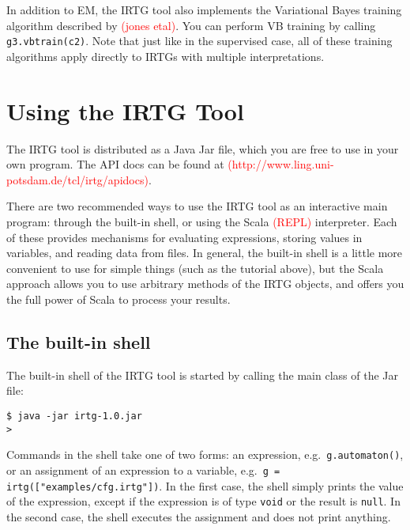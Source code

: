 \documentclass[11pt]{article}
\newcommand{\todo}[1]{\textcolor{red}{(#1)}}
\begin{document}
In addition to EM, the IRTG tool also implements the Variational Bayes
training algorithm described by \todo{jones etal}.  You can perform VB
training by calling \verb?g3.vbtrain(c2)?.  Note that just like in the
supervised case, all of these training algorithms apply directly to
IRTGs with multiple interpretations.



\section{Using the IRTG Tool} \label{sec:using}

The IRTG tool is distributed as a Java Jar file, which you are free to
use in your own program. The API docs can be found at
\todo{http://www.ling.uni-potsdam.de/tcl/irtg/apidocs}.

There are two recommended ways to use the IRTG tool as an interactive
main program: through the built-in shell, or using the Scala
\todo{REPL} interpreter.  Each of these provides mechanisms for
evaluating expressions, storing values in variables, and reading data
from files.  In general, the built-in shell is a little more
convenient to use for simple things (such as the tutorial above), but
the Scala approach allows you to use arbitrary methods of the IRTG
objects, and offers you the full power of Scala to process your
results.

\subsection{The built-in shell}

The built-in shell of the IRTG tool is started by calling the main
class of the Jar file:

\begin{verbatim}
$ java -jar irtg-1.0.jar
> 
\end{verbatim}

Commands in the shell take one of two forms: an expression, e.g.\
\verb?g.automaton()?, or an assignment of an expression to a variable,
e.g.\ \verb?g = irtg(["examples/cfg.irtg"])?.  In the first case, the
shell simply prints the value of the expression, except if the
expression is of type \verb?void? or the result is \verb?null?. In the
second case, the shell executes the assignment and does not print
anything.
\end{document}
